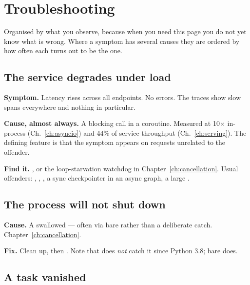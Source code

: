 \chapter{Troubleshooting}
\label{app:troubleshooting}

\noindent
Organised by what you observe, because when you need this page you do not yet
know what is wrong. Where a symptom has several causes they are ordered by how
often each turns out to be the one.

\section{The service degrades under load}
\label{sec:tsA}

\textbf{Symptom.} Latency rises across all endpoints. No errors. The traces show
slow spans everywhere and nothing in particular.

\textbf{Cause, almost always.} A blocking call in a coroutine. Measured at
10$\times$ in-process (Ch.~\ref{ch:asyncio}) and 44\% of service throughput
(Ch.~\ref{ch:serving}). The defining feature is that the symptom appears on
requests unrelated to the offender.

\textbf{Find it.} , or the loop-starvation watchdog in
Chapter~\ref{ch:cancellation}. Usual offenders: ,
, , a sync checkpointer in an async graph, a
large .

\section{The process will not shut down}
\label{sec:tsB}

\textbf{Cause.} A swallowed  --- often via bare
 rather than a deliberate catch. Chapter~\ref{ch:cancellation}.

\textbf{Fix.} Clean up, then . Note that  does
\emph{not} catch it since Python 3.8; bare  does.

\section{A task vanished}
\label{sec:tsC}

